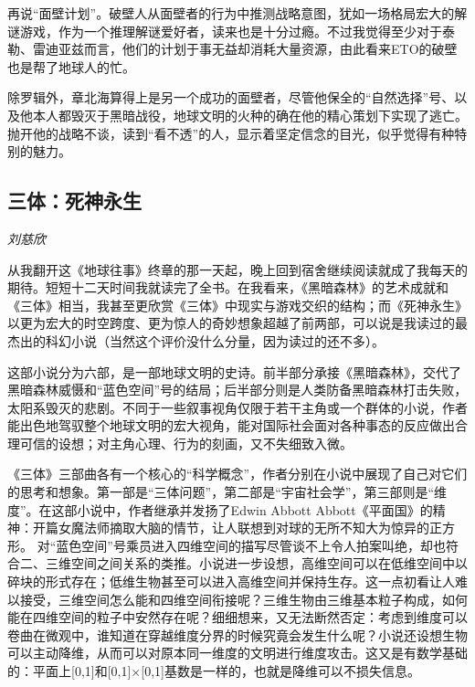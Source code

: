 \par 再说“面壁计划”。破壁人从面壁者的行为中推测战略意图，犹如一场格局宏大的解谜游戏，作为一个推理解谜爱好者，读来也是十分过瘾。不过我觉得至少对于泰勒、雷迪亚兹而言，他们的计划于事无益却消耗大量资源，由此看来ETO的破壁也是帮了地球人的忙。
\par 除罗辑外，章北海算得上是另一个成功的面壁者，尽管他保全的“自然选择”号、以及他本人都毁灭于黑暗战役，地球文明的火种的确在他的精心策划下实现了逃亡。抛开他的战略不谈，读到“看不透”的人，显示着坚定信念的目光，似乎觉得有种特别的魅力。
\par {}

\subsection*{三体：死神永生}
\par \emph{刘慈欣} 
\par 从我翻开这《地球往事》终章的那一天起，晚上回到宿舍继续阅读就成了我每天的期待。短短十二天时间我就读完了全书。在我看来，《黑暗森林》的艺术成就和《三体》相当，我甚至更欣赏《三体》中现实与游戏交织的结构；而《死神永生》以更为宏大的时空跨度、更为惊人的奇妙想象超越了前两部，可以说是我读过的最杰出的科幻小说（当然这个评价没什么分量，因为读过的还不多）。
\par 这部小说分为六部，是一部地球文明的史诗。前半部分承接《黑暗森林》，交代了黑暗森林威慑和“蓝色空间”号的结局；后半部分则是人类防备黑暗森林打击失败，太阳系毁灭的悲剧。不同于一些叙事视角仅限于若干主角或一个群体的小说，作者能出色地驾驭整个地球文明的宏大视角，能对国际社会面对各种事态的反应做出合理可信的设想；对主角心理、行为的刻画，又不失细致入微。
\par 《三体》三部曲各有一个核心的“科学概念”，作者分别在小说中展现了自己对它们的思考和想象。第一部是“三体问题”，第二部是“宇宙社会学”，第三部则是“维度”。在这部小说中，作者继承并发扬了Edwin Abbott Abbott《平面国》的精神：开篇女魔法师摘取大脑的情节，让人联想到对球的无所不知大为惊异的正方形。 对“蓝色空间”号乘员进入四维空间的描写尽管谈不上令人拍案叫绝，却也符合二、三维空间之间关系的类推。小说进一步设想，高维空间可以在低维空间中以碎块的形式存在；低维生物甚至可以进入高维空间并保持生存。这一点初看让人难以接受，三维空间怎么能和四维空间衔接呢？三维生物由三维基本粒子构成，如何能在四维空间的粒子中安然存在呢？细细想来，又无法断然否定：考虑到维度可以卷曲在微观中，谁知道在穿越维度分界的时候究竟会发生什么呢？小说还设想生物可以主动降维，从而可以对原本同一维度的文明进行维度攻击。这又是有数学基础的：平面上[0,1]和[0,1]×[0,1]基数是一样的，也就是降维可以不损失信息。
